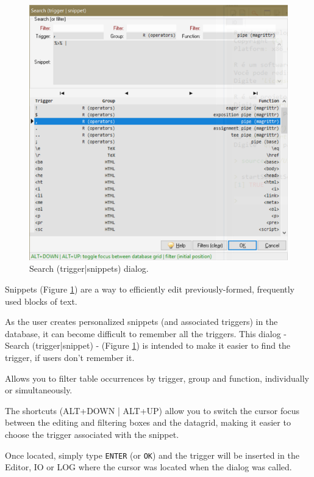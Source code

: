 \begin{figure}[H]
  \begin{center}
    \includegraphics[scale=0.60]{./res/dlg_search_trigger_snippet.png}
  \end{center}
  \caption{Search (trigger|snippets) dialog.}
  \label{fig:dlg_tinn-r_search_trigger}
\end{figure}
Snippets
(Figure \ref{fig:dlg_tinn-r_search_trigger})
are a way to efficiently edit previously-formed, frequently used blocks of text.

As the user creates personalized snippets (and associated triggers) in the database,
it can become difficult to remember all the triggers.
This dialog - Search (trigger|snippet) - (Figure \ref{fig:dlg_tinn-r_search_trigger}) is intended
to make it easier to find the trigger, if users don't remember it.

Allows you to filter table occurrences by trigger, group and function, individually or simultaneously.

The shortcuts (ALT+DOWN | ALT+UP) allow you to switch the cursor focus between the editing and
filtering boxes and the datagrid, making it easier to choose the trigger associated with the snippet.

Once located, simply type \texttt{ENTER} (or \texttt{OK}) and the trigger will be inserted in the Editor,
IO or LOG where the cursor was located when the dialog was called.

